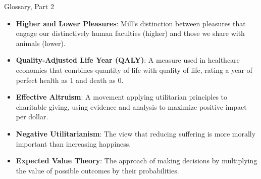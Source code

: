 \documentclass[aspectratio=169]{beamer}
\begin{document}
\begin{frame}{Glossary, Part 2}
    \begin{itemize}
        \item \textbf{Higher and Lower Pleasures}: Mill's distinction between pleasures that engage our distinctively human faculties (higher) and those we share with animals (lower).
        
        \item \textbf{Quality-Adjusted Life Year (QALY)}: A measure used in healthcare economics that combines quantity of life with quality of life, rating a year of perfect health as 1 and death as 0.
        
        \item \textbf{Effective Altruism}: A movement applying utilitarian principles to charitable giving, using evidence and analysis to maximize positive impact per dollar.
        
        \item \textbf{Negative Utilitarianism}: The view that reducing suffering is more morally important than increasing happiness.
        
        \item \textbf{Expected Value Theory}: The approach of making decisions by multiplying the value of possible outcomes by their probabilities.
    \end{itemize}
\end{frame}
\end{document}
